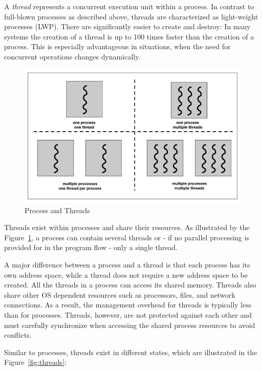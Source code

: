 \documentclass[11pt, a4paper]{article}
\begin{document}
A \textit{thread} represents a concurrent execution unit within a process. In contrast to full-blown processes as described above, threads are characterized as light-weight processes (LWP). There are significantly easier to create and destroy: In many systems the creation of a thread is up to 100 times faster than the creation of a process. This is especially advantageous in situations, when the need for concurrent operations changes dynamically. 


\begin{figure}[htpb!]
	\centering
	\includegraphics[width=0.8\linewidth]{process_threads}
	\caption{Process and Threads}
	\label{fig:process_threads}
\end{figure}




Threads exist within processes and share their resources. As illustrated by the Figure~\ref{fig:process_threads}, a process can contain several threads or - if no parallel processing is provided for in the program flow - only a single thread.

A major difference between a process and a thread is that each process has its own address space, while a thread does not require a new address space to be created. All the threads in a process can access its shared memory. Threads also share other OS dependent resources such as processors, files, and network connections. As a result, the management overhead for threads is typically less than for processes. Threads, however, are not protected against each other and must carefully synchronize when accessing the shared process resources to avoid conflicts.


Similar to processes, threads exist in different states, which are illustrated in the Figure~\ref{fig:threads}: 
\end{document}
